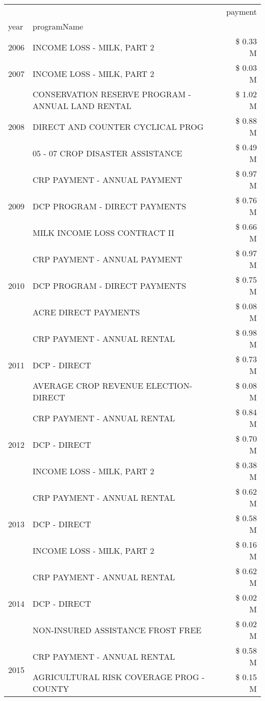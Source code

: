 \begin{tabular}{llr}
\toprule
 &  & payment \\
year & programName &  \\
\midrule
2006 & INCOME LOSS - MILK, PART 2 & \$ 0.33 M \\
\cline{1-3}
2007 & INCOME LOSS - MILK, PART 2 & \$ 0.03 M \\
\cline{1-3}
\multirow[t]{3}{*}{2008} & CONSERVATION RESERVE PROGRAM - ANNUAL LAND RENTAL & \$ 1.02 M \\
 & DIRECT AND COUNTER CYCLICAL PROG & \$ 0.88 M \\
 & 05 - 07 CROP DISASTER ASSISTANCE & \$ 0.49 M \\
\cline{1-3}
\multirow[t]{3}{*}{2009} & CRP PAYMENT - ANNUAL PAYMENT & \$ 0.97 M \\
 & DCP PROGRAM - DIRECT PAYMENTS & \$ 0.76 M \\
 & MILK INCOME LOSS CONTRACT II & \$ 0.66 M \\
\cline{1-3}
\multirow[t]{3}{*}{2010} & CRP PAYMENT - ANNUAL PAYMENT & \$ 0.97 M \\
 & DCP PROGRAM - DIRECT PAYMENTS & \$ 0.75 M \\
 & ACRE DIRECT PAYMENTS & \$ 0.08 M \\
\cline{1-3}
\multirow[t]{3}{*}{2011} & CRP PAYMENT - ANNUAL RENTAL & \$ 0.98 M \\
 & DCP - DIRECT & \$ 0.73 M \\
 & AVERAGE CROP REVENUE ELECTION-DIRECT & \$ 0.08 M \\
\cline{1-3}
\multirow[t]{3}{*}{2012} & CRP PAYMENT - ANNUAL RENTAL & \$ 0.84 M \\
 & DCP - DIRECT & \$ 0.70 M \\
 & INCOME LOSS - MILK, PART 2 & \$ 0.38 M \\
\cline{1-3}
\multirow[t]{3}{*}{2013} & CRP PAYMENT - ANNUAL RENTAL & \$ 0.62 M \\
 & DCP - DIRECT & \$ 0.58 M \\
 & INCOME LOSS - MILK, PART 2 & \$ 0.16 M \\
\cline{1-3}
\multirow[t]{3}{*}{2014} & CRP PAYMENT - ANNUAL RENTAL & \$ 0.62 M \\
 & DCP - DIRECT & \$ 0.02 M \\
 & NON-INSURED ASSISTANCE FROST FREE & \$ 0.02 M \\
\cline{1-3}
\multirow[t]{3}{*}{2015} & CRP PAYMENT - ANNUAL RENTAL & \$ 0.58 M \\
 & AGRICULTURAL RISK COVERAGE PROG - COUNTY & \$ 0.15 M \\

\end{tabular}
